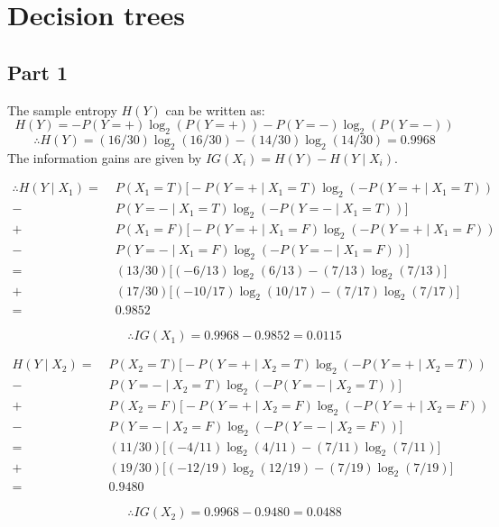 \documentclass[english]{article}
\begin{document}
\pagebreak
\section{Decision trees}
\subsection{Part 1}
The sample entropy $H(Y)$ can be written as:
$$H(Y) = -P(Y = +) \log_{2} (P(Y = +)) - P(Y = -) \log_{2} (P(Y = -))$$
$$\therefore H(Y) = (16/30) \log_{2} (16/30) - (14/30) \log_{2} (14/30) = 0.9968$$
The information gains are given by $IG(X_i) = H(Y) - H(Y \mid X_i)$.

\begin{align*}
  \therefore H(Y \mid X_1) =&\; P(X_1 = T) \bigg[-P(Y = + \mid X_1 = T) \log_{2} (-P(Y = + \mid X_1 = T)) \\
  -&\; P(Y = - \mid X_1 = T) \log_{2} (-P(Y = - \mid X_1 = T))\bigg] \\
  +&\; P(X_1 = F) \bigg[-P(Y = + \mid X_1 = F) \log_{2} (-P(Y = + \mid X_1 = F)) \\
  -&\; P(Y = - \mid X_1 = F) \log_{2} (-P(Y = - \mid X_1 = F))\bigg] \\
  =&\; (13/30)\bigg[(-6/13) \log_{2}(6/13) - (7/13) \log_{2}(7/13) \bigg] \\
  +&\; (17/30)\bigg[(-10/17) \log_{2}(10/17) - (7/17) \log_{2}(7/17) \bigg] \\
  =&\; 0.9852
\end{align*}

$$\therefore IG(X_1) = 0.9968 - 0.9852 = 0.0115$$

\begin{align*}
  H(Y \mid X_2) =&\; P(X_2 = T) \bigg[-P(Y = + \mid X_2 = T) \log_{2} (-P(Y = + \mid X_2 = T)) \\
  -&\; P(Y = - \mid X_2 = T) \log_{2} (-P(Y = - \mid X_2 = T))\bigg] \\
  +&\; P(X_2 = F) \bigg[-P(Y = + \mid X_2 = F) \log_{2} (-P(Y = + \mid X_2 = F)) \\
  -&\; P(Y = - \mid X_2 = F) \log_{2} (-P(Y = - \mid X_2 = F))\bigg] \\
  =&\; (11/30)\bigg[(-4/11) \log_{2}(4/11) - (7/11) \log_{2}(7/11) \bigg] \\
  +&\; (19/30)\bigg[(-12/19) \log_{2}(12/19) - (7/19) \log_{2}(7/19) \bigg] \\
  =&\; 0.9480
\end{align*}

$$\therefore IG(X_2) = 0.9968 - 0.9480 = 0.0488$$
\end{document}

